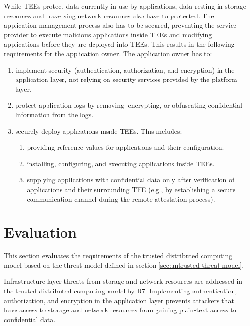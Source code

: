 While TEEs protect data currently in use by applications, data resting in
storage resources and traversing network resources also have to protected. The
application management process also has to be secured, preventing the service
provider to execute malicious applications inside TEEs and modifying
applications before they are deployed into TEEs. This results in the following
requirements for the application owner. The application owner has to:

\begin{enumerate}[resume,label*=R\arabic*]
  \item implement security (authentication, authorization, and encryption) in
        the application layer, not relying on security services provided by the
        platform layer.
  \item protect application logs by removing, encrypting, or obfuscating
        confidential information from the logs.
  \item securely deploy applications inside TEEs. This includes:
        \begin{enumerate}[label*=.\arabic*]
          \item providing reference values for applications and their
                configuration.
          \item installing, configuring, and executing applications inside TEEs.
          \item supplying applications with confidential data only after
                verification of applications and their surrounding TEE (e.g., by
                establishing a secure communication channel during the remote
                attestation process).
        \end{enumerate}
\end{enumerate}


\section{Evaluation}
\label{sec:evaluation}

This section evaluates the requirements of the trusted distributed computing
model based on the threat model defined in section
\ref{sec:untrusted-threat-model}.

Infrastructure layer threats from storage and network resources are addressed in
the trusted distributed computing model by R7. Implementing authentication,
authorization, and encryption in the application layer prevents attackers that
have access to storage and network resources from gaining plain-text access to
confidential data.


